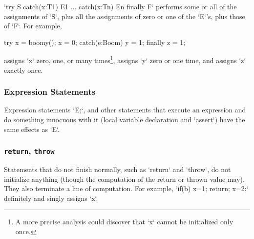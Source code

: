 \xcd`try S catch(x:T1) E1 ... catch(x:Tn) En finally F` 
performs some or all of the assignments of \xcd`S`, plus all the assignments
of zero or one of the \xcd`E`'s, plus those of \xcd`F`.  
For example,
\begin{xten}
try {
  x = boomy();
  x = 0;
}
catch(e:Boom) { y = 1; }
finally { z = 1; }
\end{xten}
\noindent 
assigns \xcd`x` zero, one, or many times\footnote{A more precise
analysis could discover that \xcd`x` cannot be initialized only once.}, 
assigns \xcd`y` zero or one time, and assigns \xcd`z` exactly once.

\subsubsection{Expression Statements}

Expression statements \xcd`E;`, and other statements that execute an
expression and do something innocuous with it (local variable declaration and
\xcd`assert`) have the same effects as \xcd`E`. 

\subsubsection{{\tt return}, {\tt throw}}

Statements that do not finish normally, such as \xcd`return` and \xcd`throw`,
do not initialize anything (though the computation of the return or thrown
value may).    They also terminate a line of computation.  For example, 
\xcd`if(b) {x=1; return;}  x=2;` definitely and singly assigns \xcd`x`.  
